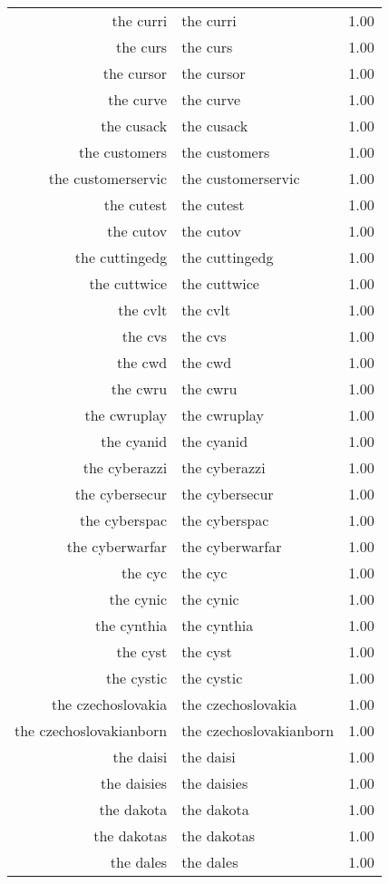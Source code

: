 \begin{table}[ht]
\begin{tabular}{rlr}
  the curri & the curri & 1.00 \\ 
  the curs & the curs & 1.00 \\ 
  the cursor & the cursor & 1.00 \\ 
  the curve & the curve & 1.00 \\ 
  the cusack & the cusack & 1.00 \\ 
  the customers & the customers & 1.00 \\ 
  the customerservic & the customerservic & 1.00 \\ 
  the cutest & the cutest & 1.00 \\ 
  the cutov & the cutov & 1.00 \\ 
  the cuttingedg & the cuttingedg & 1.00 \\ 
  the cuttwice & the cuttwice & 1.00 \\ 
  the cvlt & the cvlt & 1.00 \\ 
  the cvs & the cvs & 1.00 \\ 
  the cwd & the cwd & 1.00 \\ 
  the cwru & the cwru & 1.00 \\ 
  the cwruplay & the cwruplay & 1.00 \\ 
  the cyanid & the cyanid & 1.00 \\ 
  the cyberazzi & the cyberazzi & 1.00 \\ 
  the cybersecur & the cybersecur & 1.00 \\ 
  the cyberspac & the cyberspac & 1.00 \\ 
  the cyberwarfar & the cyberwarfar & 1.00 \\ 
  the cyc & the cyc & 1.00 \\ 
  the cynic & the cynic & 1.00 \\ 
  the cynthia & the cynthia & 1.00 \\ 
  the cyst & the cyst & 1.00 \\ 
  the cystic & the cystic & 1.00 \\ 
  the czechoslovakia & the czechoslovakia & 1.00 \\ 
  the czechoslovakianborn & the czechoslovakianborn & 1.00 \\ 
  the daisi & the daisi & 1.00 \\ 
  the daisies & the daisies & 1.00 \\ 
  the dakota & the dakota & 1.00 \\ 
  the dakotas & the dakotas & 1.00 \\ 
  the dales & the dales & 1.00 \\ 

\end{tabular}
\end{table}
